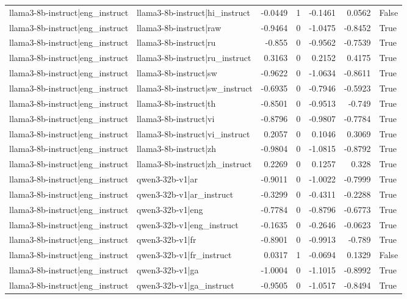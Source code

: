 \begin{table}
\begin{tabular}{l l r r r r l}
llama3-8b-instruct|eng_instruct & llama3-8b-instruct|hi_instruct & -0.0449 & 1 & -0.1461 & 0.0562 & False \\
llama3-8b-instruct|eng_instruct & llama3-8b-instruct|raw & -0.9464 & 0 & -1.0475 & -0.8452 & True \\
llama3-8b-instruct|eng_instruct & llama3-8b-instruct|ru & -0.855 & 0 & -0.9562 & -0.7539 & True \\
llama3-8b-instruct|eng_instruct & llama3-8b-instruct|ru_instruct & 0.3163 & 0 & 0.2152 & 0.4175 & True \\
llama3-8b-instruct|eng_instruct & llama3-8b-instruct|sw & -0.9622 & 0 & -1.0634 & -0.8611 & True \\
llama3-8b-instruct|eng_instruct & llama3-8b-instruct|sw_instruct & -0.6935 & 0 & -0.7946 & -0.5923 & True \\
llama3-8b-instruct|eng_instruct & llama3-8b-instruct|th & -0.8501 & 0 & -0.9513 & -0.749 & True \\
llama3-8b-instruct|eng_instruct & llama3-8b-instruct|vi & -0.8796 & 0 & -0.9807 & -0.7784 & True \\
llama3-8b-instruct|eng_instruct & llama3-8b-instruct|vi_instruct & 0.2057 & 0 & 0.1046 & 0.3069 & True \\
llama3-8b-instruct|eng_instruct & llama3-8b-instruct|zh & -0.9804 & 0 & -1.0815 & -0.8792 & True \\
llama3-8b-instruct|eng_instruct & llama3-8b-instruct|zh_instruct & 0.2269 & 0 & 0.1257 & 0.328 & True \\
llama3-8b-instruct|eng_instruct & qwen3-32b-v1|ar & -0.9011 & 0 & -1.0022 & -0.7999 & True \\
llama3-8b-instruct|eng_instruct & qwen3-32b-v1|ar_instruct & -0.3299 & 0 & -0.4311 & -0.2288 & True \\
llama3-8b-instruct|eng_instruct & qwen3-32b-v1|eng & -0.7784 & 0 & -0.8796 & -0.6773 & True \\
llama3-8b-instruct|eng_instruct & qwen3-32b-v1|eng_instruct & -0.1635 & 0 & -0.2646 & -0.0623 & True \\
llama3-8b-instruct|eng_instruct & qwen3-32b-v1|fr & -0.8901 & 0 & -0.9913 & -0.789 & True \\
llama3-8b-instruct|eng_instruct & qwen3-32b-v1|fr_instruct & 0.0317 & 1 & -0.0694 & 0.1329 & False \\
llama3-8b-instruct|eng_instruct & qwen3-32b-v1|ga & -1.0004 & 0 & -1.1015 & -0.8992 & True \\
llama3-8b-instruct|eng_instruct & qwen3-32b-v1|ga_instruct & -0.9505 & 0 & -1.0517 & -0.8494 & True \\

\end{tabular}
\end{table}
